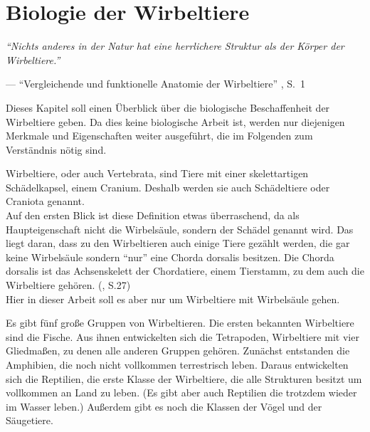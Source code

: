 \chapter{Biologie der Wirbeltiere}
\label{chapter:biology}

\begin{center}
 \begin{minipage}{12cm}
  \emph{"`Nichts anderes in der Natur hat eine herrlichere Struktur als der Körper der Wirbeltiere."'}
 
  --- "`Vergleichende und funktionelle Anatomie der Wirbeltiere"' \cite{Vergleichende_Anatomie}, S.\ 1
 \end{minipage}
\end{center}

Dieses Kapitel soll einen Überblick über die biologische Beschaffenheit der Wirbeltiere geben. Da dies keine biologische Arbeit ist, werden nur diejenigen Merkmale und Eigenschaften weiter ausgeführt, die im Folgenden zum Verständnis nötig sind.

Wirbeltiere, oder auch Vertebrata, sind Tiere mit einer skelettartigen Schädelkapsel, einem Cranium. Deshalb werden sie auch Schädeltiere oder Craniota genannt.\\
Auf den ersten Blick ist diese Definition etwas überraschend, da als  Haupteigenschaft nicht die Wirbelsäule, sondern der Schädel genannt wird. Das liegt daran, dass zu den Wirbeltieren auch einige Tiere gezählt werden, die gar keine Wirbelsäule sondern "`nur"' eine Chorda dorsalis besitzen. Die Chorda dorsalis ist das Achsenskelett der Chordatiere, einem Tierstamm, zu dem auch die Wirbeltiere gehören. (\cite{Vergleichende_Anatomie}, S.27)\\ %
Hier in dieser Arbeit soll es aber nur um Wirbeltiere mit Wirbelsäule gehen.

Es gibt fünf große Gruppen von Wirbeltieren. Die ersten bekannten Wirbeltiere sind die Fische. Aus ihnen entwickelten sich die Tetrapoden, Wirbeltiere mit vier Gliedmaßen, zu denen alle anderen Gruppen gehören. Zunächst entstanden die Amphibien, die noch nicht vollkommen terrestrisch leben. Daraus entwickelten sich die Reptilien, die erste Klasse der Wirbeltiere, die alle Strukturen besitzt um vollkommen an Land zu leben. (Es gibt aber auch Reptilien die trotzdem wieder im Wasser leben.) Außerdem gibt es noch die Klassen der Vögel und der Säugetiere.

